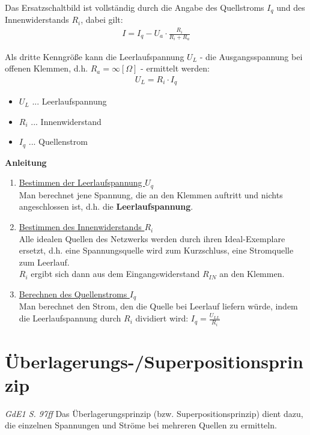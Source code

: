 Das Ersatzschaltbild ist vollständig durch die Angabe des Quellstroms $I_q$ und des Innenwiderstands $R_i$, dabei gilt:
\begin{align}
    I = I_q - U_a \cdot \frac{R_i}{R_i + R_a}
\end{align}

Als dritte Kenngröße kann die Leerlaufspannung $U_L$ - die Ausgangsspannung bei offenen Klemmen, d.h. $R_a = \infty[\Omega]$ - ermittelt werden:
\begin{align}
    U_L = R_i \cdot I_q
\end{align}
\begin{itemize}
    \item $U_L$ ... Leerlaufspannung
    \item $R_i$ ... Innenwiderstand
    \item $I_q$ ... Quellenstrom
\end{itemize}

\textbf{Anleitung} \\
\begin{enumerate}
    \item \underline{Bestimmen der Leerlaufspannung $U_q$} \\
    Man berechnet jene Spannung, die an den Klemmen auftritt und nichts angeschlossen ist, d.h. die \textbf{Leerlaufspannung}.
    
    \item \underline{Bestimmen des Innenwiderstands $R_i$} \\
    Alle idealen Quellen des Netzwerks werden durch ihren Ideal-Exemplare ersetzt, d.h. eine Spannungsquelle wird zum Kurzschluss, eine Stromquelle zum Leerlauf. \\
    $R_i$ ergibt sich dann aus dem Eingangswiderstand $R_{IN}$ an den Klemmen.
    
    \item \underline{Berechnen des Quellenstroms $I_q$} \\
    Man berechnet den Strom, den die Quelle bei Leerlauf liefern würde, indem die Leerlaufspannung durch $R_i$ dividiert wird: $I_q = \frac{U_{LL}}{R_i}$ 
\end{enumerate}


\section{Überlagerungs-/Superpositionsprinzip}
\textit{GdE1 S. 97ff}
Das Überlagerungsprinzip (bzw. Superpositionsprinzip) dient dazu, die einzelnen Spannungen und Ströme bei mehreren Quellen zu ermitteln.

